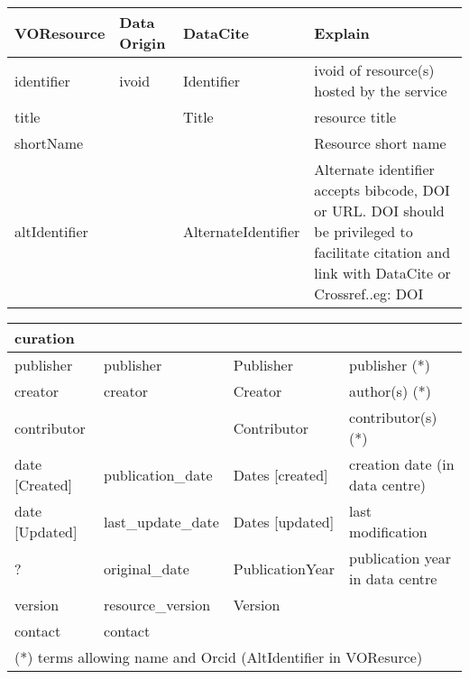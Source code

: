 \documentclass[11pt,a4paper]{ivoa}
\begin{document}
\label{tab:voresourcemapping}
\begin{tabular}{|p{3cm}|p{3cm}|p{3cm}|p{5cm}|} \hline
\textbf{VOResource} & \textbf{Data Origin} & \textbf{DataCite} & \textbf{Explain} \\ \hline
identifier    &ivoid & Identifier & ivoid of resource(s) hosted by the service\\ \hline
title         & & Title& resource title\\ \hline
shortName     &&& Resource short name\\ \hline
altIdentifier &  & AlternateIdentifier&
              Alternate identifier accepts bibcode, DOI or URL. DOI should be privileged to facilitate citation and link with DataCite or Crossref..eg: DOI \\ \hline
\end{tabular}

\begin{tabular}{|p{3cm}|p{3cm}|p{3cm}|p{5cm}|} \hline
\multicolumn{4}{|l|}{\textbf{curation}} \\ \hline
publisher     & publisher & Publisher &publisher (*)\\ \hline
creator       & creator & Creator & author(s) (*)\\ \hline
contributor   & & Contributor & contributor(s) (*)\\ \hline
date [Created]&  publication\_date  & Dates [created] & creation date (in data centre)\\ \hline
date [Updated]&  last\_update\_date & Dates [updated] & last modification\\ \hline
  ?           &  original\_date & PublicationYear & publication year in data centre\\ \hline
version       & resource\_version & Version &\\ \hline
contact       & contact &&\\ \hline
\multicolumn{4}{l}{\small \footnotesize(*) terms allowing name and Orcid (AltIdentifier in VOResurce)} \\
\end{tabular}
\end{document}
